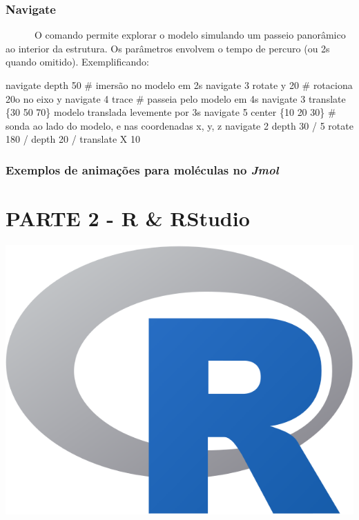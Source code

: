 \documentclass[
  letterpaper,
  DIV=11,
  numbers=noendperiod]{scrreprt}
\newenvironment{Shaded}{\begin{snugshade}}{\end{snugshade}}
\newcommand{\CommentTok}[1]{\textcolor[rgb]{0.37,0.37,0.37}{#1}}
\newcommand{\DecValTok}[1]{\textcolor[rgb]{0.68,0.00,0.00}{#1}}
\newcommand{\NormalTok}[1]{\textcolor[rgb]{0.00,0.23,0.31}{#1}}
\newcommand{\SpecialCharTok}[1]{\textcolor[rgb]{0.37,0.37,0.37}{#1}}
\begin{document}
\section{Navigate}\label{navigate}

~~~~~~O comando permite explorar o modelo simulando um passeio
panorâmico ao interior da estrutura. Os parâmetros envolvem o tempo de
percuro (ou 2s quando omitido). Exemplificando:

\begin{Shaded}
\begin{Highlighting}[]
\NormalTok{navigate depth }\DecValTok{50} \CommentTok{\# imersão no modelo em 2s}
\NormalTok{navigate }\DecValTok{3}\NormalTok{ rotate y }\DecValTok{20} \CommentTok{\# rotaciona 20o no eixo y}
\NormalTok{navigate }\DecValTok{4}\NormalTok{ trace }\CommentTok{\# passeia pelo modelo em 4s}
\NormalTok{navigate }\DecValTok{3}\NormalTok{ translate \{}\DecValTok{30} \DecValTok{50} \DecValTok{70}\NormalTok{\} modelo translada levemente por }\DecValTok{3}\NormalTok{s}
\NormalTok{navigate }\DecValTok{5}\NormalTok{ center \{}\DecValTok{10} \DecValTok{20} \DecValTok{30}\NormalTok{\} }\CommentTok{\# sonda ao lado do modelo, e nas coordenadas x, y, z}
\NormalTok{navigate }\DecValTok{2}\NormalTok{ depth }\DecValTok{30} \SpecialCharTok{/} \DecValTok{5}\NormalTok{ rotate }\DecValTok{180} \SpecialCharTok{/}\NormalTok{ depth }\DecValTok{20} \SpecialCharTok{/}\NormalTok{ translate X }\DecValTok{10}
\end{Highlighting}
\end{Shaded}

\section{\texorpdfstring{Exemplos de animações para moléculas no
\emph{Jmol}}{Exemplos de animações para moléculas no Jmol}}\label{exemplos-de-animauxe7uxf5es-para-moluxe9culas-no-jmol}

\part{PARTE 2 - R \& RStudio}

\includegraphics[width=2\textwidth,height=\textheight]{RPart.png}
\end{document}

